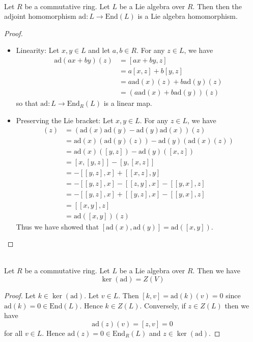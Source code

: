 \documentclass[a4paper]{article}
\begin{document}
\begin{lmm}{}{}\\
Let $R$ be a commutative ring. Let $L$ be a Lie algebra over $R$. Then then the adjoint homomorphism $\text{ad}:L\to\text{End}(L)$ is a Lie algebra homomorphism. 
\begin{proof}~\\
\begin{itemize}
\item Linearity: Let $x,y\in L$ and let $a,b\in R$. For any $z\in L$, we have
\begin{align*}
\text{ad}(ax+by)(z)&=[ax+by,z]\\
&=a[x,z]+b[y,z]\\
&=a\text{ad}(x)(z)+b\text{ad}(y)(z)\\
&=\left(a\text{ad}(x)+b\text{ad}(y)\right)(z)
\end{align*}
so that $\text{ad}:L\to\text{End}_R(L)$ is a linear map. 
\item Preserving the Lie bracket: Let $x,y\in L$. For any $z\in L$, we have
\begin{align*}
[\text{ad}(x),\text{ad}(y)](z)&=\left(\text{ad}(x)\text{ad}(y)-\text{ad}(y)\text{ad}(x)\right)(z)\\
&=\text{ad}(x)\left(\text{ad}(y)(z)\right)-\text{ad}(y)\left(\text{ad}(x)(z)\right)\\
&=\text{ad}(x)([y,z])-\text{ad}(y)([x,z])\\
&=[x,[y,z]]-[y,[x,z]]\\
&=-[[y,z],x]+[[x,z],y]\\
&=-[[y,z],x]-[[z,y],x]-[[y,x],z]\\
&=-[[y,z],x]+[[y,z],x]-[[y,x],z]\\
&=[[x,y],z]\\
&=\text{ad}([x,y])(z)
\end{align*}
Thus we have showed that $[\text{ad}(x),\text{ad}(y)]=\text{ad}([x,y])$. 
\end{itemize}
\end{proof}
\end{lmm}

\begin{lmm}{}{}\\
Let $R$ be a commutative ring. Let $L$ be a Lie algebra over $R$. Then we have $$\ker(\text{ad})=Z(V)$$
\begin{proof}
Let $k\in\ker(\text{ad})$. Let $v\in L$. Then $[k,v]=\text{ad}(k)(v)=0$ since $\text{ad}(k)=0\in\text{End}(L)$. Hence $k\in Z(L)$. Conversely, if $z\in Z(L)$ then we have $$\text{ad}(z)(v)=[z,v]=0$$ for all $v\in L$. Hence $\text{ad}(z)=0\in\text{End}_R(L)$ and $z\in\ker(\text{ad})$. 
\end{proof}
\end{lmm}
\end{document}
